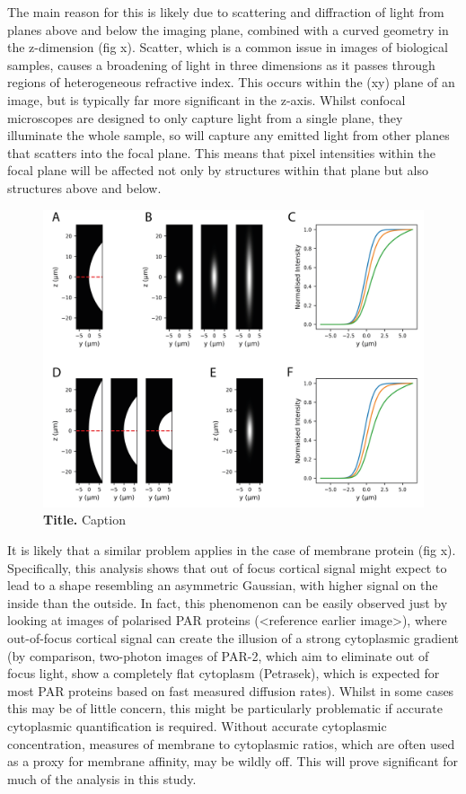 \documentclass[12pt]{"article"}
\newcommand{\mycaption}[2]{\caption[#1]{\textbf{#1.} #2}}
\begin{document}
The main reason for this is likely due to scattering and diffraction of light from planes above and below the imaging plane, combined with a curved geometry in the z-dimension (fig x). Scatter, which is a common issue in images of biological samples, causes a broadening of light in three dimensions as it passes through regions of heterogeneous refractive index. This occurs within the (xy) plane of an image, but is typically far more significant in the z-axis. Whilst confocal microscopes are designed to only capture light from a single plane, they illuminate the whole sample, so will capture any emitted light from other planes that scatters into the focal plane. This means that pixel intensities within the focal plane will be affected not only by structures within that plane but also structures above and below.\\


\begin{figure}[!h]
\includegraphics[scale=0.9]{memquant_cyt_psf}
\setlength{\abovecaptionskip}{20pt}
\centering
\mycaption{Title}{Caption}
\end{figure}

It is likely that a similar problem applies in the case of membrane protein (fig x). Specifically, this analysis shows that out of focus cortical signal might expect to lead to a shape resembling an asymmetric Gaussian, with higher signal on the inside than the outside. In fact, this phenomenon can be easily observed just by looking at images of polarised PAR proteins (<reference earlier image>), where out-of-focus cortical signal can create the illusion of a strong cytoplasmic gradient (by comparison, two-photon images of PAR-2, which aim to eliminate out of focus light, show a completely flat cytoplasm (Petrasek), which is expected for most PAR proteins based on fast measured diffusion rates). Whilst in some cases this may be of little concern, this might be particularly problematic if accurate cytoplasmic quantification is required. Without accurate cytoplasmic concentration, measures of membrane to cytoplasmic ratios, which are often used as a proxy for membrane affinity, may be wildly off. This will prove significant for much of the analysis in this study.\\
\end{document}
